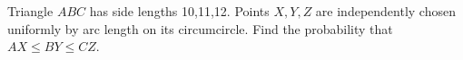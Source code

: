 Triangle $ABC$ has side lengths 10,11,12. Points $X,Y,Z$ are independently chosen uniformly by arc length on its circumcircle. Find the probability that $AX\le BY\le CZ$.

